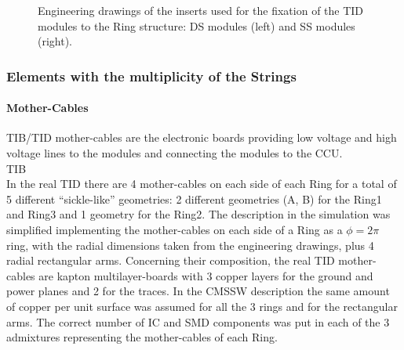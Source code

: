\documentclass{cmspaper}
\begin{document}
\begin{figure}[hbtp]
  \begin{center}
    \caption{Engineering drawings of the inserts used for the
    fixation of the TID modules to the Ring structure: DS modules (left) and SS modules (right).}
    \label{fig:tid_modulefix}
  \end{center}
\end{figure}

\subsubsection{Elements with the multiplicity of the Strings}
\paragraph{Mother-Cables} 
TIB/TID mother-cables are the electronic boards providing low voltage
and high voltage lines to the modules and connecting the modules to the CCU.\\

\fixme TIB\\

In the real TID there are 4 mother-cables on each side of each Ring for a
total of 5 different ``sickle-like'' geometries: 2 different
geometries (A, B) for the Ring1 and
Ring3 and 1 geometry for the Ring2. The description in the simulation
was simplified implementing the mother-cables on each side of a Ring
as a $\phi=2\pi$ ring, with the radial dimensions taken from the
engineering drawings, plus 4 radial rectangular arms. 
Concerning their composition, the real TID mother-cables are kapton
multilayer-boards with 3 copper layers for the ground and power planes and 2 for
the traces. In the CMSSW description the same amount of copper per
unit surface was assumed for all the 3 rings and for the rectangular arms.
The correct number of IC and SMD components was put in each of the 3 admixtures
representing the mother-cables of each Ring.
\end{document}
